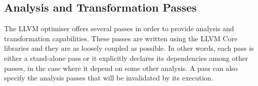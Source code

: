 



\subsection{Analysis and Transformation Passes}

The LLVM optimiser offers several passes in order to provide analysis and transformation capabilities.
These passes are written using the LLVM Core libraries and they are as loosely coupled as possible.
In other words, each pass is either a stand-alone pass or it explicitly declares its dependencies among other passes, in the case where it depend on some other analysis.
A pass can also specify the analysis passes that will be invalidated by its execution.

